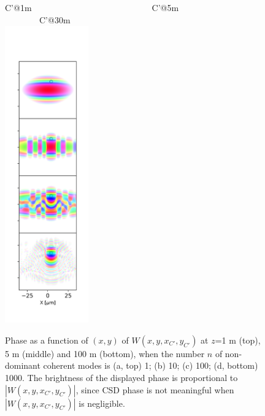 \documentclass{iucr}              %
\begin{document}
\begin{figure}\label{pointC_propagated}%
\caption{Phase as a function of $(x,y)$ of $W(x,y,x_{C'},y_{C'})$ at $z$=1 m (top), 5 m (middle) and 100 m (bottom), when the number $n$ of non-dominant coherent modes is (a, top) 1; (b) 10; (c) 100; (d, bottom) 1000. The brightness of the displayed phase is proportional to $|W(x,y,x_{C'},y_{C'})|$, since CSD phase is not meaningful when $|W(x,y,x_{C'},y_{C'})|$ is negligible.}
C'@1m~~~~~~~~~~~~~~~~~~~~~~~~~~~~C'@5m~~~~~~~~~~~~~~~~~~~~~~~~~~~~C'@30m\\
\includegraphics[width=0.32\textwidth]{Figures/vx_id16a_C1_propagated.png}

\end{figure}
\end{document}
